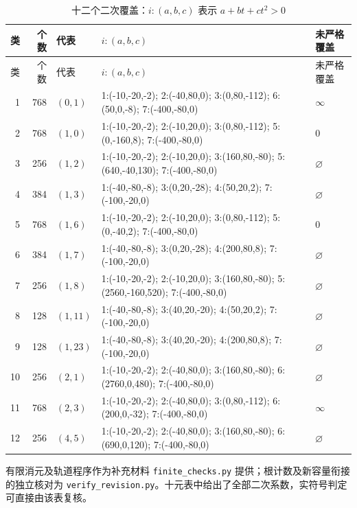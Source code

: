 \documentclass[11pt,a4paper]{article}
\theoremstyle{definition}
\numberwithin{equation}{section}
\begin{document}
\begingroup\small
\begin{longtable}{r r l p{83mm} p{24mm}}
\caption{十二个二次覆盖：$i:(a,b,c)$ 表示 $a+bt+ct^2>0$}\label{tab:ten-data}\\
\toprule 类&个数&代表&$i:(a,b,c)$&未严格覆盖\\\midrule\endfirsthead
\toprule 类&个数&代表&$i:(a,b,c)$&未严格覆盖\\\midrule\endhead
1&768&$(0,1)$&1:(-10,-20,-2); 2:(-40,80,0); 3:(0,80,-112); 6:(50,0,-8); 7:(-400,-80,0)&$\infty$\\
2&768&$(1,0)$&1:(-10,-20,-2); 2:(-10,20,0); 3:(0,80,-112); 5:(0,-160,8); 7:(-400,-80,0)&0\\
3&256&$(1,2)$&1:(-10,-20,-2); 2:(-10,20,0); 3:(160,80,-80); 5:(640,-40,130); 7:(-400,-80,0)&$\varnothing$\\
4&384&$(1,3)$&1:(-40,-80,-8); 3:(0,20,-28); 4:(50,20,2); 7:(-100,-20,0)&$\varnothing$\\
5&768&$(1,6)$&1:(-10,-20,-2); 2:(-10,20,0); 3:(0,80,-112); 5:(0,-40,2); 7:(-400,-80,0)&0\\
6&384&$(1,7)$&1:(-40,-80,-8); 3:(0,20,-28); 4:(200,80,8); 7:(-100,-20,0)&$\varnothing$\\
7&256&$(1,8)$&1:(-10,-20,-2); 2:(-10,20,0); 3:(160,80,-80); 5:(2560,-160,520); 7:(-400,-80,0)&$\varnothing$\\
8&128&$(1,11)$&1:(-40,-80,-8); 3:(40,20,-20); 4:(50,20,2); 7:(-100,-20,0)&$\varnothing$\\
9&128&$(1,23)$&1:(-40,-80,-8); 3:(40,20,-20); 4:(200,80,8); 7:(-100,-20,0)&$\varnothing$\\
10&256&$(2,1)$&1:(-10,-20,-2); 2:(-40,80,0); 3:(160,80,-80); 6:(2760,0,480); 7:(-400,-80,0)&$\varnothing$\\
11&768&$(2,3)$&1:(-10,-20,-2); 2:(-40,80,0); 3:(0,80,-112); 6:(200,0,-32); 7:(-400,-80,0)&$\infty$\\
12&256&$(4,5)$&1:(-10,-20,-2); 2:(-40,80,0); 3:(160,80,-80); 6:(690,0,120); 7:(-400,-80,0)&$\varnothing$\\
\bottomrule\end{longtable}
\endgroup

有限消元及轨道程序作为补充材料 \texttt{finite\_checks.py} 提供；根计数及新容量衔接的独立核对为 \texttt{verify\_revision.py}。十元表中给出了全部二次系数，实符号判定可直接由该表复核。
\end{document}
